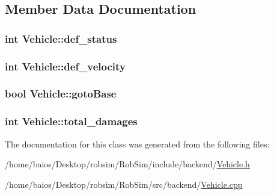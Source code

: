 \subsection{Member Data Documentation}
\hypertarget{class_vehicle_a18846d0cdc78a3f2137e70021af01492}{
\subsubsection[{def\-\_\-status}]{\setlength{\rightskip}{0pt plus 5cm}int Vehicle\-::def\-\_\-status}}\label{class_vehicle_a18846d0cdc78a3f2137e70021af01492}
\hypertarget{class_vehicle_a8ec5bc4761c8ab8b17a69d9a9e8c5d2c}{
\subsubsection[{def\-\_\-velocity}]{\setlength{\rightskip}{0pt plus 5cm}int Vehicle\-::def\-\_\-velocity}}\label{class_vehicle_a8ec5bc4761c8ab8b17a69d9a9e8c5d2c}
\hypertarget{class_vehicle_a0130974e6ab67f6a2b59772b5de4cc6e}{
\subsubsection[{goto\-Base}]{\setlength{\rightskip}{0pt plus 5cm}bool Vehicle\-::goto\-Base}}\label{class_vehicle_a0130974e6ab67f6a2b59772b5de4cc6e}
\hypertarget{class_vehicle_a9ff49e3ecf77a8b92fb3d48ccd08dba3}{
\subsubsection[{total\-\_\-damages}]{\setlength{\rightskip}{0pt plus 5cm}int Vehicle\-::total\-\_\-damages}}\label{class_vehicle_a9ff49e3ecf77a8b92fb3d48ccd08dba3}


The documentation for this class was generated from the following files\-:\begin{DoxyCompactItemize}
\item 
/home/baios/\-Desktop/robsim/\-Rob\-Sim/include/backend/\hyperlink{_vehicle_8h}{Vehicle.\-h}\item 
/home/baios/\-Desktop/robsim/\-Rob\-Sim/src/backend/\hyperlink{_vehicle_8cpp}{Vehicle.\-cpp}\end{DoxyCompactItemize}
